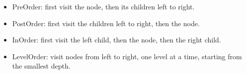 \begin{itemize}

\item PreOrder: first visit the node, then its children left to right.

  \item PostOrder: first visit the children left to right, then the node.

  \item InOrder: first visit the left child, then the node, then the right child.

  \item LevelOrder: visit nodes from left to right, one level at a time,
    starting from the smallest depth.

\end{itemize}
